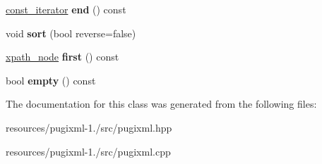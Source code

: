\begin{DoxyCompactItemize}
\item 
\hypertarget{classpugi_1_1xpath__node__set_a8dea1d6fc28789d909936805ed1afcd8}{\hyperlink{classpugi_1_1xpath__node}{const\+\_\+iterator} {\bfseries end} () const }\label{classpugi_1_1xpath__node__set_a8dea1d6fc28789d909936805ed1afcd8}

\item 
\hypertarget{classpugi_1_1xpath__node__set_a7f264ad9a2736e9dc2d6a2de25cb67d1}{void {\bfseries sort} (bool reverse=false)}\label{classpugi_1_1xpath__node__set_a7f264ad9a2736e9dc2d6a2de25cb67d1}

\item 
\hypertarget{classpugi_1_1xpath__node__set_a89c35cc7c823b842b8afeccc796aa6f9}{\hyperlink{classpugi_1_1xpath__node}{xpath\+\_\+node} {\bfseries first} () const }\label{classpugi_1_1xpath__node__set_a89c35cc7c823b842b8afeccc796aa6f9}

\item 
\hypertarget{classpugi_1_1xpath__node__set_a854e0b24839e8fdaa6b14bbd66e7ce98}{bool {\bfseries empty} () const }\label{classpugi_1_1xpath__node__set_a854e0b24839e8fdaa6b14bbd66e7ce98}

\end{DoxyCompactItemize}


The documentation for this class was generated from the following files\+:\begin{DoxyCompactItemize}
\item 
resources/pugixml-\/1./src/pugixml.\+hpp\item 
resources/pugixml-\/1./src/pugixml.\+cpp\end{DoxyCompactItemize}
